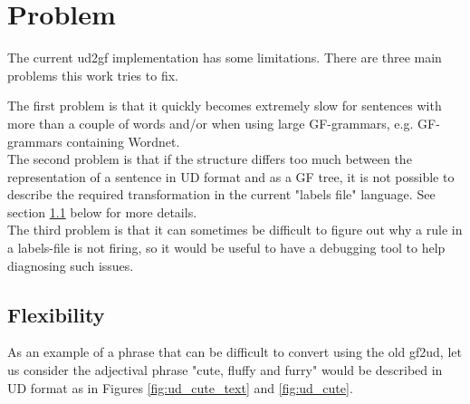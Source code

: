 \documentclass{article}
\begin{document}
\section{Problem}



The current ud2gf implementation has some limitations. There are three main problems this work tries to fix.

The first problem is that it quickly becomes extremely slow for sentences with more than a couple of words and/or
when using large GF-grammars, e.g. GF-grammars containing Wordnet\cite{angelov2016predicting}. \\
The second problem is that if the structure differs too much between the representation of a sentence in UD format and as a GF tree, it is not possible to describe the required transformation in the current "labels file" language. See section \ref{sect:flex} below for more details. \\
The third problem is that it can sometimes be difficult to figure out why a rule in a labels-file is not firing, so it would be useful to have a debugging tool to help diagnosing such issues.


\subsection{Flexibility}\label{sect:flex}

As an example of a phrase that can be difficult to convert using the old gf2ud, let us consider the adjectival phrase "cute, fluffy and furry"
would be described in UD format as in Figures \ref{fig:ud_cute_text} and \ref{fig:ud_cute}.
\end{document}
